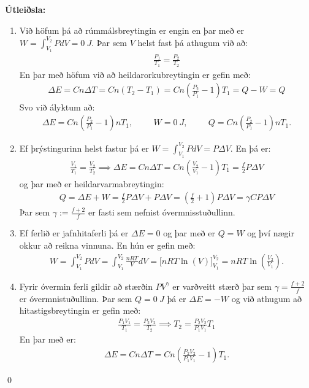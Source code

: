 \textbf{Útleiðsla:} \begin{enumerate}[label = \textbf{(\alph*)}]
    \item Við höfum þá að rúmmálsbreytingin er engin en þar með er $W = \int_{V_1}^{V_2} P dV = \SI{0}{J}$. Þar sem $V$ helst fast þá athugum við að:
    \begin{align*}
        \frac{P_1}{T_1} = \frac{P_2}{T_2}
    \end{align*}
    En þar með höfum við að heildarorkubreytingin er gefin með:
    \begin{align*}
        \Delta E = Cn \Delta T = Cn \left(T_2 - T_1 \right) = C n \left( \frac{P_2}{P_1} - 1\right) T_1 = Q - W = Q
    \end{align*}
    Svo við ályktum að:
    \begin{align*}
        \Delta E = C n \left( \frac{P_2}{P_1} - 1 \right)nT_1, \hspace{1cm} W = \SI{0}{J}, \hspace{1cm} Q = C n \left( \frac{P_2}{P_1} - 1 \right)nT_1.
    \end{align*}
    
    \item Ef þrýstingurinn helst fastur þá er $W = \int_{V_1}^{V_2}PdV = P \Delta V$. En þá er:
    \begin{align*}
        \frac{V_1}{T_1} = \frac{V_2}{T_2} \implies \Delta E = Cn \Delta T = Cn \left( \frac{V_2}{V_1}-1 \right)T_1 = \frac{f}{2} P \Delta V
    \end{align*}
    og þar með er heildarvarmabreytingin:
    \begin{align*}
        Q = \Delta E + W = \frac{f}{2} P \Delta V + P\Delta V = \left(\frac{f}{2}+1\right) P \Delta V = \gamma C P\Delta V
    \end{align*}
    Þar sem $\gamma := \frac{f+2}{f}$ er fasti sem nefnist óvermnisstuðullinn.
    
    \item Ef ferlið er jafnhitaferli þá er $\Delta E = 0$ og þar með er $Q = W$ og því nægir okkur að reikna vinnuna. En hún er gefin með:
    \begin{align*}
        W = \int_{V_1}^{V_2} PdV = \int_{V_1}^{V_2} \frac{nRT}{V}dV = \Bigg[ nRT \ln(V) \Bigg]_{V_1}^{V_2} = nRT \ln(\frac{V_2}{V_1}).
    \end{align*}
    \item Fyrir óvermin ferli gildir að stærðin $PV^\gamma$ er varðveitt stærð þar sem $\gamma = \frac{f+2}{f}$ er óvermnistuðullinn. Þar sem $Q = \SI{0}{J}$ þá er $\Delta E = -W$ og við athugum að hitastigsbreytingin er gefin með:
    \begin{align*}
        \frac{P_1 V_1}{T_1} = \frac{P_2 V_2}{T_2} \implies T_2 = \frac{P_2 V_2}{P_1 V_1}T_1
    \end{align*}
    En þar með er:
    \begin{align*}
        \Delta E = Cn\Delta T = Cn \left( \frac{P_2 V_2}{P_1 V_1} - 1 \right)T_1.
    \end{align*}
\end{enumerate}
\qed


